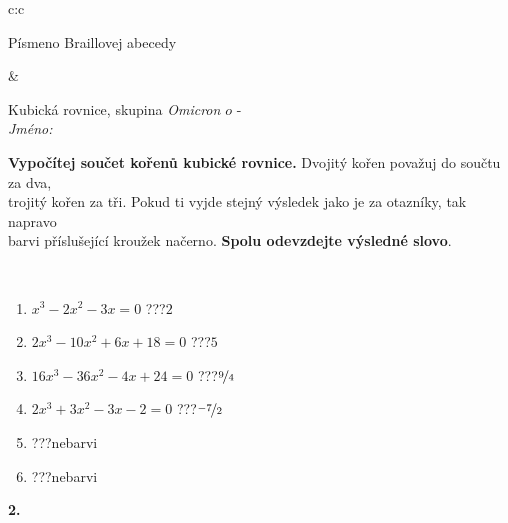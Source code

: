 \documentclass[10pt]{report}
\newcommand\omicron{o}
\begin{document}
\begin{tabular}{c:c}
\begin{minipage}[c][104.5mm][t]{0.5\linewidth}
\begin{center}
\begin{minipage}{0.20\linewidth}
\begin{center}
{\small Písmeno Braillovej abecedy}
\end{center}
\end{minipage}
\end{center}
\end{minipage}
&
\begin{minipage}[c][104.5mm][t]{0.5\linewidth}
\begin{center}
\vspace{7mm}
{\huge Kubická rovnice, skupina \textit{Omicron $\omicron$} -}\\[5mm]
\textit{Jméno:}\phantom{xxxxxxxxxxxxxxxxxxxxxxxxxxxxxxxxxxxxxxxxxxxxxxxxxxxxxxxxxxxxxxxxx}\\[5mm]
\begin{minipage}{0.95\linewidth}
\begin{center}
\textbf{Vypočítej součet kořenů kubické rovnice.} Dvojitý kořen považuj do součtu za dva,\\trojitý kořen za tři. Pokud ti vyjde stejný výsledek jako je za otazníky, tak napravo\\barvi příslušející kroužek načerno. \textbf{Spolu odevzdejte výsledné slovo}.
\end{center}
\end{minipage}
\\[1mm]
\begin{minipage}{0.79\linewidth}
\begin{center}
\begin{varwidth}{\linewidth}
\begin{enumerate}
\Large
\item $x^3-2x^2-3x=0$\quad \dotfill\; ???\;\dotfill \quad $2$
\item $2x^3-10x^2+6x+18=0$\quad \dotfill\; ???\;\dotfill \quad $5$
\item $16x^3-36x^2-4x+24=0$\quad \dotfill\; ???\;\dotfill \quad $\nicefrac{9}{4}$
\item $2x^3+3x^2-3x-2=0$\quad \dotfill\; ???\;\dotfill \quad $\nicefrac{-7}{2}$
\item \quad \dotfill\; ???\;\dotfill \quad nebarvi
\item \quad \dotfill\; ???\;\dotfill \quad nebarvi
\end{enumerate}
\end{varwidth}
\end{center}
\end{minipage}
\begin{minipage}{0.20\linewidth}
\begin{center}
{\Huge\bfseries 2.} \\[2mm]

\end{center}
\end{minipage}
\end{center}
\end{minipage}
\end{tabular}
\end{document}
